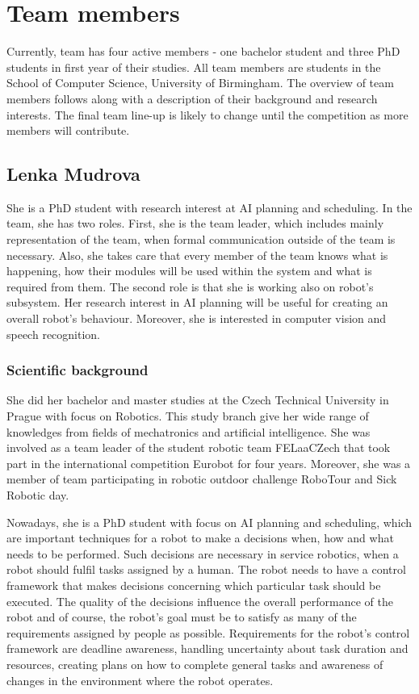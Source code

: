 \documentclass[conference]{IEEEtran}
\begin{document}
\section{Team members}

Currently, team has four active members - one bachelor student and three PhD students in first year of their studies. All team members are students in the School of Computer Science, University of Birmingham. The overview of team members follows along with a description of their background and research interests. The final team line-up is likely to change until the competition as more members will contribute.

\subsection{Lenka Mudrova}

She is a PhD student with research interest at AI planning and scheduling. In the team, she has two roles. First, she is the team leader, which includes mainly representation of the team, when formal communication outside of the team is necessary. Also, she takes care that every member of the team knows what is happening, how their modules will be used within the system and what is required from them. The second role is that she is working also on robot's subsystem. Her research interest in AI planning will be useful for creating an overall robot's behaviour. Moreover, she is interested in computer vision and speech recognition. 

\subsubsection*{Scientific background}
She did her bachelor and master studies at the Czech Technical University in Prague with focus on Robotics. This study branch give her wide range of knowledges from fields of mechatronics and artificial intelligence. She was involved as a team leader of the student robotic team FELaaCZech that took part in the international competition Eurobot for four years. Moreover, she was a member of team participating in robotic outdoor challenge RoboTour and Sick Robotic day. 

Nowadays, she is a PhD student with focus on AI planning and scheduling, which are important techniques for a robot to make a decisions when, how and what needs to be performed. Such decisions are necessary in service robotics, when a robot should fulfil tasks assigned by a human. 
The robot needs to have a control framework that makes decisions concerning which particular task should be executed. The quality of the decisions influence the overall performance of the robot and of course, the robot's goal must be to satisfy as many of the requirements assigned by people as possible. Requirements for the robot's control framework are deadline awareness, handling uncertainty about task duration and resources, creating plans on how to complete general tasks and awareness of changes in the environment where the robot operates. 
\end{document}
